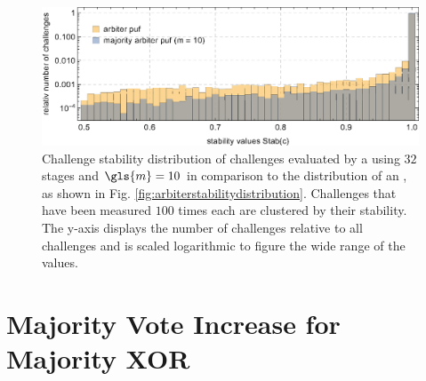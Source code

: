 
\begin{figure}[!htp]
\includegraphics[width=1.00\textwidth]{images/comparison-arbiter-stability-distribution-majority-arbiter-stability-distribution.eps}
\caption[Challenge stability distribution of a \mpuf]{Challenge stability distribution of challenges evaluated by a \mpuf using $32$ stages and $\gls{m} = 10$ in comparison to the distribution of an \apuf, as shown in Fig. \ref{fig:arbiterstabilitydistribution}. Challenges that have been measured $100$ times each are clustered by their stability. The y-axis displays the number of challenges relative to all challenges and is scaled logarithmic to figure the wide range of the values.} 
\label{fig:comparisonarbiterstabilitydistributionmajorityarbiterstabilitydistribution}
\end{figure}



\section{Majority Vote Increase for Majority \acs{XOR} \apufs}
\label{sec:majorityvotegrowth}

